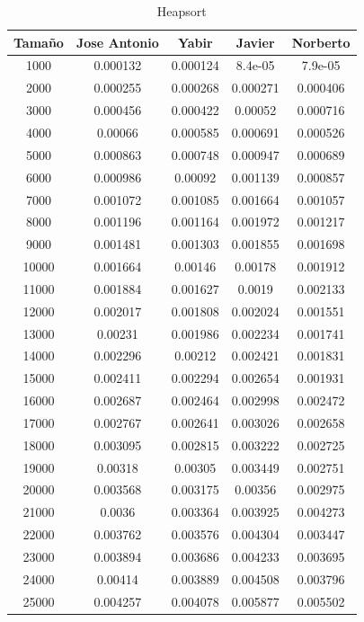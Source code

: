 \documentclass[11pt,a4paper]{article}
\begin{document}
\begin{table}[h]
	\centering
	\caption{Heapsort}
	\begin{tabular}{ | c | c  | c | c | c | }
		\hline
		Tama\~no & Jose Antonio & Yabir & Javier & Norberto\\ 
		\hline
		1000	&	0.000132	&	0.000124	&	8.4e-05	&	7.9e-05	\\
		2000	&	0.000255	&	0.000268	&	0.000271	&	0.000406	\\
		3000	&	0.000456	&	0.000422	&	0.00052	&	0.000716	\\
		4000	&	0.00066	&	0.000585	&	0.000691	&	0.000526	\\
		5000	&	0.000863	&	0.000748	&	0.000947	&	0.000689	\\
		6000	&	0.000986	&	0.00092	&	0.001139	&	0.000857	\\
		7000	&	0.001072	&	0.001085	&	0.001664	&	0.001057	\\
		8000	&	0.001196	&	0.001164	&	0.001972	&	0.001217	\\
		9000	&	0.001481	&	0.001303	&	0.001855	&	0.001698	\\
		10000	&	0.001664	&	0.00146	&	0.00178	&	0.001912	\\
		11000	&	0.001884	&	0.001627	&	0.0019	&	0.002133	\\
		12000	&	0.002017	&	0.001808	&	0.002024	&	0.001551	\\
		13000	&	0.00231	&	0.001986	&	0.002234	&	0.001741	\\
		14000	&	0.002296	&	0.00212	&	0.002421	&	0.001831	\\
		15000	&	0.002411	&	0.002294	&	0.002654	&	0.001931	\\
		16000	&	0.002687	&	0.002464	&	0.002998	&	0.002472	\\
		17000	&	0.002767	&	0.002641	&	0.003026	&	0.002658	\\
		18000	&	0.003095	&	0.002815	&	0.003222	&	0.002725	\\
		19000	&	0.00318	&	0.00305	&	0.003449	&	0.002751	\\
		20000	&	0.003568	&	0.003175	&	0.00356	&	0.002975	\\
		21000	&	0.0036	&	0.003364	&	0.003925	&	0.004273	\\
		22000	&	0.003762	&	0.003576	&	0.004304	&	0.003447	\\
		23000	&	0.003894	&	0.003686	&	0.004233	&	0.003695	\\
		24000	&	0.00414	&	0.003889	&	0.004508	&	0.003796	\\
		25000	&	0.004257	&	0.004078	&	0.005877	&	0.005502	\\
		\hline
	\end{tabular}
\end{table}
\end{document}
